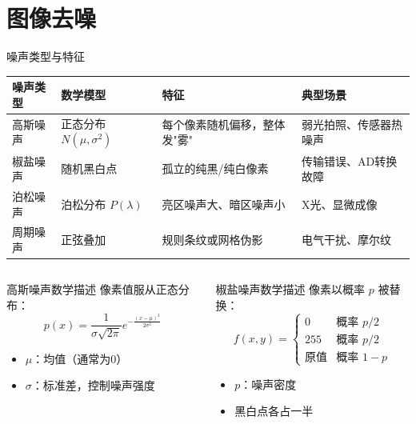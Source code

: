 
\section{图像去噪}

\begin{frame}{噪声类型与特征}
	\begin{table}
		\centering
		\small
		\begin{tabular}{llp{4.5cm}l}
			\toprule
			\textbf{噪声类型} & \textbf{数学模型} & \textbf{特征} & \textbf{典型场景} \\
			\midrule
			高斯噪声 & 正态分布 $N(\mu,\sigma^2)$ & 每个像素随机偏移，整体发"雾" & 弱光拍照、传感器热噪声 \\
			椒盐噪声 & 随机黑白点 & 孤立的纯黑/纯白像素 & 传输错误、AD转换故障 \\
			泊松噪声 & 泊松分布 $P(\lambda)$ & 亮区噪声大、暗区噪声小 & X光、显微成像 \\
			周期噪声 & 正弦叠加 & 规则条纹或网格伪影 & 电气干扰、摩尔纹 \\
			\bottomrule
		\end{tabular}
	\end{table}

	\vspace{0.3cm}

	\begin{columns}
		\begin{block}{高斯噪声数学描述}
			像素值服从正态分布：
			$$p(x) = \frac{1}{\sigma\sqrt{2\pi}} e^{-\frac{(x-\mu)^2}{2\sigma^2}}$$
			\begin{itemize}
				\item $\mu$：均值（通常为0）
				\item $\sigma$：标准差，控制噪声强度
			\end{itemize}
		\end{block}

		\begin{block}{椒盐噪声数学描述}
			像素以概率 $p$ 被替换：
			$$f(x,y) = \begin{cases} 0 & \text{概率 } p/2 \\ 255 & \text{概率 } p/2 \\ \text{原值} & \text{概率 } 1-p \end{cases}$$
			\begin{itemize}
				\item $p$：噪声密度
				\item 黑白点各占一半
			\end{itemize}
		\end{block}
	\end{columns}
\end{frame}


